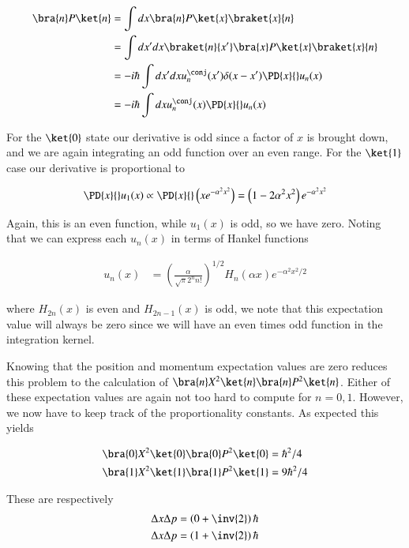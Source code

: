 \begin{align*}
\bra{n} P \ket{n} 
&=
\int dx \bra{n} P \ket{x}\braket{x}{n} \\
&=
\int dx' dx \braket{n}{x'} \bra{x} P \ket{x} \braket{x}{n} \\
&=
-i \hbar \int dx' dx u_n^\conj(x') \delta(x-x') \PD{x}{} u_n(x) \\
&=
-i \hbar \int dx u_n^\conj(x) \PD{x}{} u_n(x) \\
\end{align*}

For the $\ket{0}$ state our derivative is odd since a factor of $x$ is brought down, and we are again integrating an odd function over an even range.  For the $\ket{1}$ case our derivative is proportional to

\begin{align*}
\PD{x}{} u_1(x) 
\propto
\PD{x}{} \left( x e^{-\alpha^2 x^2 } \right)
=
\left( 1 -2 \alpha^2 x^2 \right) e^{-\alpha^2 x^2 } 
\end{align*}

Again, this is an even function, while $u_1(x)$ is odd, so we have zero.  Noting that we can express each $u_n(x)$ in terms of Hankel functions

\begin{align}\label{eqn:desaiCh9:302}
u_n(x) &= \left( \frac{ \alpha}{\sqrt{\pi} 2^n n!} \right)^{1/2} H_n(\alpha x) e^{ -\alpha^2 x^2/2}
\end{align}

where $H_{2n}(x)$ is even and $H_{2n-1}(x)$ is odd, we note that this expectation value will always be zero since we will have an even times odd function in the integration kernel.

Knowing that the position and momentum expectation values are zero reduces this problem to the calculation of $\bra{n} X^2 \ket{n} \bra{n} P^2 \ket{n}$.  Either of these expectation values are again not too hard to compute for $n=0,1$.  However, we now have to keep track of the proportionality constants.  As expected this yields

\begin{align}\label{eqn:desaiCh9:303}
\bra{0} X^2 \ket{0} \bra{0} P^2 \ket{0} &= \hbar^2/4  \\
\bra{1} X^2 \ket{1} \bra{1} P^2 \ket{1} &= 9 \hbar^2/4
\end{align}

These are respectively
\begin{align}\label{eqn:desaiCh9:304}
\Delta x \Delta p &= \left( 0 + \inv{2} \right) \hbar \\
\Delta x \Delta p &= \left( 1 + \inv{2} \right) \hbar
\end{align}

